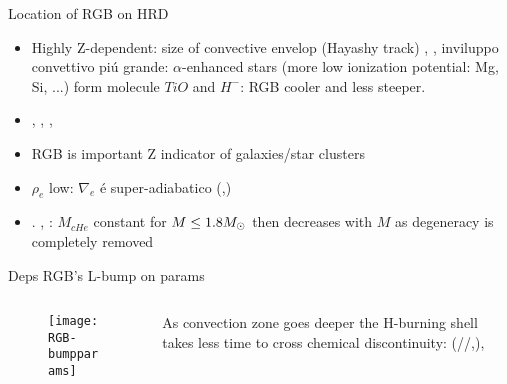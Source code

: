\begin{frame}{Location of RGB on HRD}
\begin{itemize}
\item Highly Z-dependent: size of convective envelop (Hayashy track) , \xaumenta{\kappa}, inviluppo convettivo pi\'u grande:  $\alpha$-enhanced stars (more low ionization potential: Mg, Si, ...) form molecule $TiO$ and $H^-$: RGB cooler and less steeper.
\item {}, \xdiminuisce{\kappa}, , 
\item RGB is important Z indicator of galaxies/star clusters
\item $\rho_e$ low: $\nabla_e$ \'e super-adiabatico (,)
\item {}. , : $M_{cHe}$ constant for $M\leq1.8M_{\odot}{}$ then decreases with $M$ as degeneracy is completely removed 
\end{itemize}
\end{frame}

\begin{frame}{Deps RGB's L-bump on params}
\begin{columns}[T]\begin{column}{0.55\textwidth}
\begin{figure}[!ht]
\texttt{[image: RGB-bumpparams]}\label{fig:RGB-bumpparams}
\end{figure}
\end{column}
\begin{column}{0.45\textwidth}
As convection zone goes deeper the H-burning shell takes less time to cross chemical discontinuity: (//,), 
\end{column}\end{columns}
\end{frame}

